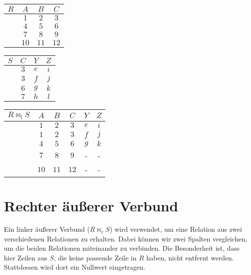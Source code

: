 \documentclass[12pt,a4paper,notitlepage,leqno]{article}
\begin{document}
\begin{center}
    \begin{tabular}{c|ccc}
        $R$ & $A$ & $B$ & $C$ \\\hline
         & $1$ & $2$ & $3$ \\
         & $4$ & $5$ & $6$ \\
         & $7$ & $8$ & $9$ \\
         & $10$ & $11$ & $12$
    \end{tabular}
    \hspace{1cm}
    \begin{tabular}{c|ccc}
        $S$ & $C$ & $Y$ & $Z$ \\\hline
         & $3$ & $e$ & $i$ \\
         & $3$ & $f$ & $j$ \\
         & $6$ & $g$ & $k$ \\
         & $7$ & $h$ & $l$
    \end{tabular}
    \hspace{1cm}
    \begin{tabular}{c|ccccc}
        $R \bowtie_l S$ & $A$ & $B$ & $C$ & $Y$ & $Z$ \\\hline
         & $1$ & $2$ & $3$ & $e$ & $i$ \\
         & $1$ & $2$ & $3$ & $f$ & $j$ \\
         & $4$ & $5$ & $6$ & $g$ & $k$\\
         & $7$ & $8$ & $9$ & - & - \\
         & $10$ & $11$ & $12$ & - & -
    \end{tabular}
\end{center}

\section*{Rechter äußerer Verbund}

Ein linker äußerer Verbund ($R \bowtie_r S$) wird verwendet, um eine Relation aus zwei verschiedenen Relationen zu erhalten. Dabei können wir zwei Spalten vergleichen, um die beiden Relationen miteinander zu verbinden. Die Besonderheit ist, dass hier Zeilen aus $S$, die keine passende Zeile in $R$ haben, nicht entfernt werden. Stattdessen wird dort ein Nullwert eingetragen. 
\end{document}
